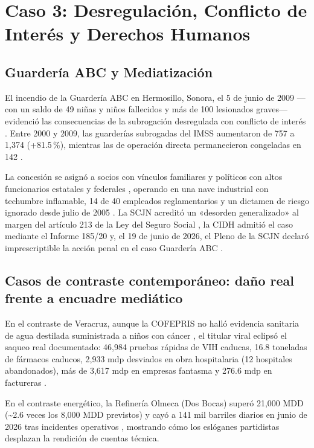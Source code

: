 \documentclass[12pt,letterpaper,oneside]{article}
\begin{document}
\clearpage

\section{Caso 3: Desregulación, Conflicto de Interés y Derechos Humanos}
\subsection{Guardería ABC y Mediatización}

El incendio de la Guardería ABC en Hermosillo, Sonora, el 5 de junio de 2009 ---con un saldo de 49 niñas y niños fallecidos y más de 100 lesionados graves--- evidenció las consecuencias de la subrogación desregulada con conflicto de interés \citep{roseackerman1999,rezzoagli2021,sernadelagarza2010}. Entre 2000 y 2009, las guarderías subrogadas del IMSS aumentaron de 757 a 1,374 (+81.5\,\%), mientras las de operación directa permanecieron congeladas en 142 \citep{leal2010}.

La concesión se asignó a socios con vínculos familiares y políticos con altos funcionarios estatales y federales \citep{osorno2010}, operando en una nave industrial con techumbre inflamable, 14 de 40 empleados reglamentarios y un dictamen de riesgo ignorado desde julio de 2005 \citep{cndh2009}. La SCJN acreditó un «desorden generalizado» al margen del artículo 213 de la Ley del Seguro Social \citep{scjn2010,scjn2025,zaldivar2010}, la CIDH admitió el caso mediante el Informe 185/20 \citep{cidh2020} y, el 19 de junio de 2026, el Pleno de la SCJN declaró imprescriptible la acción penal en el caso Guardería ABC \citep{nunez2026}.

\subsection{Casos de contraste contemporáneo: daño real frente a encuadre mediático}

En el contraste de Veracruz, aunque la COFEPRIS no halló evidencia sanitaria de agua destilada suministrada a niños con cáncer \citep{cofepris2017}, el titular viral eclipsó el saqueo real documentado: 46,984 pruebas rápidas de VIH caducas, 16.8 toneladas de fármacos caducos, 2,933 mdp desviados en obra hospitalaria (12 hospitales abandonados), más de 3,617 mdp en empresas fantasma y 276.6 mdp en factureras \citep{connectas,animalpolitico,santiago2025,angel2025}.

En el contraste energético, la Refinería Olmeca (Dos Bocas) superó 21,000 MDD (\textasciitilde2.6 veces los 8,000 MDD previstos) y cayó a 141 mil barriles diarios en junio de 2026 tras incidentes operativos \citep{alegria2026,martinezescamilla2026,celaya2026}, mostrando cómo los eslóganes partidistas desplazan la rendición de cuentas técnica.
\end{document}
